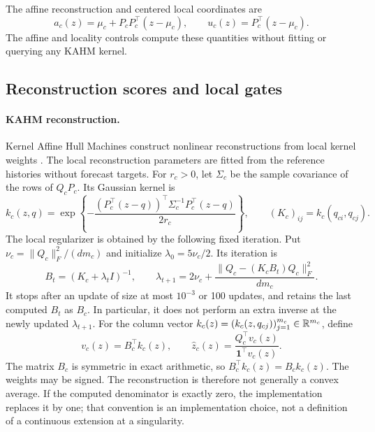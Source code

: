 The affine reconstruction and centered local coordinates are
\begin{equation}
 a_c(z)=\mu_c+P_cP_c^\top(z-\mu_c),
 \qquad u_c(z)=P_c^\top(z-\mu_c).
 \label{eq:nf-affine}
\end{equation}
The affine and locality controls compute these quantities without fitting or
querying any KAHM kernel.

\subsection{Reconstruction scores and local gates}
\label{sec:nf-gates}

\paragraph{KAHM reconstruction.}
Kernel Affine Hull Machines construct nonlinear reconstructions from local
kernel weights \citep{Kumar2024KAHM}.  The local reconstruction parameters are fitted from the reference
histories without forecast targets.  For $r_c>0$, let $\Sigma_c$ be the sample
covariance of the rows of $Q_cP_c$.  Its Gaussian kernel is
\begin{equation}
 k_c(z,q)=\exp\!\left\{-\frac{
  (P_c^\top(z-q))^\top\Sigma_c^{-1}P_c^\top(z-q)}{2r_c}\right\},
 \qquad (K_c)_{ij}=k_c(q_{ci},q_{cj}).
 \label{eq:nf-kahm-kernel}
\end{equation}
The local regularizer is obtained by the following fixed iteration. Put
$\nu_c=\|Q_c\|_F^2/(dm_c)$ and initialize $\lambda_0=5\nu_c/2$.  Its iteration is
\begin{equation}
 B_t=(K_c+\lambda_t I)^{-1},\qquad
 \lambda_{t+1}=2\nu_c+
 \frac{\|Q_c-(K_cB_t)Q_c\|_F^2}{dm_c}.
 \label{eq:nf-local-regularizer}
\end{equation}
It stops after an update of size at most $10^{-3}$ or 100 updates, and
retains the last computed $B_t$ as $B_c$.  In particular, it does not perform
an extra inverse at the newly updated $\lambda_{t+1}$.
For the column vector $k_c(z)=(k_c(z,q_{cj}))_{j=1}^{m_c}\in\mathbb{R}^{m_c}$, define
\begin{equation}
 v_c(z)=B_c^\top k_c(z),\qquad
 \widehat z_c(z)=\frac{Q_c^\top v_c(z)}{\mathbf 1^\top v_c(z)}.
 \label{eq:nf-reconstruction}
\end{equation}
The matrix $B_c$ is symmetric in exact arithmetic, so $B_c^\top k_c(z)=B_c k_c(z)$.
The weights may be signed.  The reconstruction is therefore not generally a
convex average.  If the computed denominator is exactly zero, the implementation replaces
it by one; that convention is an implementation choice, not
a definition of a continuous extension at a singularity.

